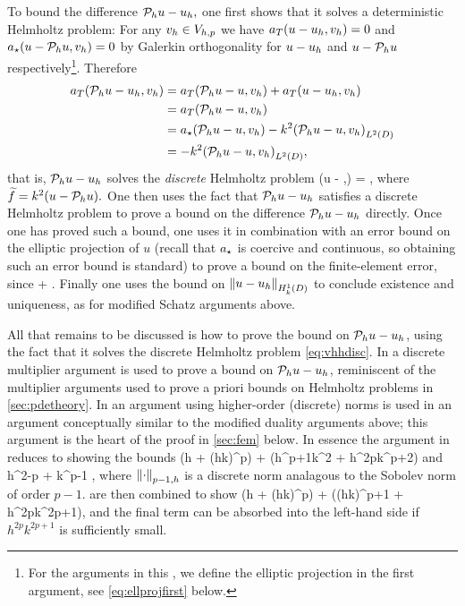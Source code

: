 To bound the difference $\mathcal P_{h} u - u_{h},$ one first shows that it solves a deterministic Helmholtz problem:
For any $v_{h} \in V_{h,p}$ we have $a_{T}(u-u_{h},v_{h}) = 0$ and $a_{\star}(u-\mathcal P_{h} u,v_{h}) = 0$ by Galerkin orthogonality for $u-u_{h}$ and $u-\mathcal P_{h} u$ respectively\footnote{For the arguments in this , we define the elliptic projection in the first argument, see \cref{eq:ellprojfirst} below.}. Therefore
\begin{align*}
  \aT(\Ph u - \uh,\vh) &= \aT(\Ph u - u,\vh) + \aT(u-\uh,\vh)\\
  &= \aT(\Ph u - u,\vh)\\
  &= \aep(\Ph u - u,\vh) - k^2\IPLtD{\Ph u - u}{\vh}\\
  &= - k^2\IPLtD{\Ph u - u}{\vh},
\end{align*}
that is, $\mathcal P_{h} u - u_{h}$ solves the \emph{discrete} Helmholtz problem
\beq\label{eq:vhhdisc}
\aT(\Ph u - \uh,\vh) = \IPLtD{\ftilde}{\vh} \tforall \vh \in \Vhp,
\eeq
where $\ftilde = k^2\mleft(u-\Ph u\mright).$ One then uses the fact that $\mathcal P_{h} u - u_{h}$ satisfies a discrete Helmholtz problem to prove a bound on the difference $\mathcal P_{h} u - u_{h}$ directly. Once one has proved such a bound, one uses it in combination with an error bound on the elliptic projection of $u$ (recall that $a_{\star}$ is coercive and continuous, so obtaining such an error bound is standard) to prove a bound on the finite-element error, since
\beqs
{} \leq {} + .
\eeqs
Finally one uses the bound on $\NHokD{u-\uh}$ to conclude existence and uniqueness, as for modified Schatz arguments above.

All that remains to be discussed is how to prove the bound on $\mathcal P_{h} u - u_{h}$, using the fact that it solves the discrete Helmholtz problem \cref{eq:vhhdisc}. In \cite{FeWu:09,FeWu:11,Wu:14} a discrete multiplier argument is used to prove a bound on $\mathcal P_{h} u - u_{h}$, reminiscent of the multiplier arguments used to prove a priori bounds on Helmholtz problems in \cref{sec:pdetheory}. In \cite{DuWu:15} an argument using higher-order (discrete) norms is used in an argument conceptually similar to the modified duality arguments above; this argument is the heart of the proof in \cref{sec:fem} below. In essence the argument in \cite{DuWu:15} reduces to showing the bounds
\beq\label{eq:duwu1}
 \lesssim \mleft(h + \mleft(hk\mright)^p\mright) + \mleft(h^{p+1}k^2 + h^{2p}k^{p+2}\mright)
\eeq
and
\beq\label{eq:duwu2}
 \lesssim h^{2-p}  + k^{p-1} ,
\eeq
where $\Nfn{p-1,h}{\cdot}$ is a discrete norm analagous to the Sobolev norm of order $p-1$.  are then combined to show
\beqs
{} \lesssim \mleft(h + \mleft(hk\mright)^p\mright) + \mleft(\mleft(hk\mright)^{p+1} + h^{2p}k^{2p+1}\mright),
\eeqs
and the final term can be absorbed into the left-hand side if $h^{2p}k^{2p+1}$ is sufficiently small.

